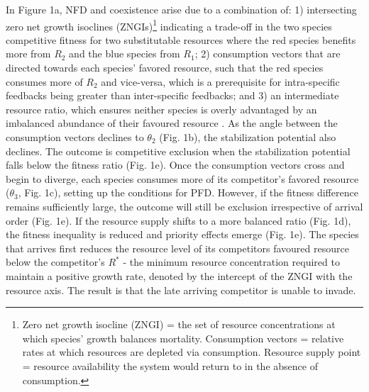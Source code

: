 \noindent In Figure 1a, NFD and coexistence arise due to a combination of: 1) intersecting zero net growth isoclines (ZNGIs)\footnote{Zero net growth isocline (ZNGI) = the set of resource concentrations at which species' growth balances mortality. Consumption vectors = relative rates at which resources are depleted via consumption. Resource supply point = resource availability the system would return to in the absence of consumption.} indicating a trade-off in the two species competitive fitness for two substitutable resources where the red species benefits more from $R_{2}$ and the blue species from $R_{1}$; 2) consumption vectors that are directed towards each species' favored resource, such that the red species consumes more of $R_{2}$ and vice-versa, which is a prerequisite for intra-specific feedbacks being greater than inter-specific feedbacks; and 3) an intermediate resource ratio, which ensures neither species is overly advantaged by an imbalanced abundance of their favoured resource \citep{Chase2003, Letten2017}. As the angle between the consumption vectors declines to $\theta_{2}$ (Fig. 1b), the stabilization potential also declines. The outcome is competitive exclusion when the stabilization potential falls below the fitness ratio (Fig. 1e). Once the consumption vectors cross and begin to diverge, each species consumes more of its competitor's favored resource ($\theta_{3}$, Fig. 1c), setting up the conditions for PFD. However, if the fitness difference remains sufficiently large, the outcome will still be exclusion irrespective of arrival order (Fig. 1e). If the resource supply shifts to a more balanced ratio (Fig. 1d), the fitness inequality is reduced and priority effects emerge (Fig. 1e). The species that arrives first reduces the resource level of its competitors favoured resource below the competitor's $R^*$ - the minimum resource concentration required to maintain a positive growth rate, denoted by the intercept of the ZNGI with the resource axis. The result is that the late arriving competitor is unable to invade. 
\par



